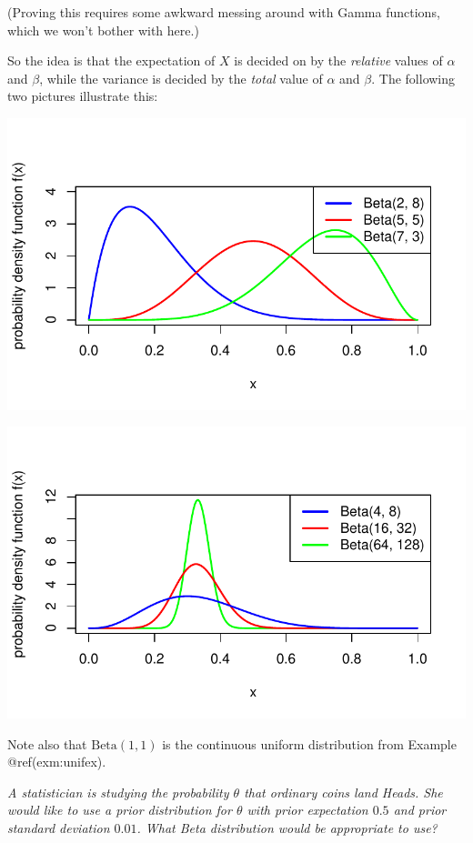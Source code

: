 \documentclass[
  letterpaper,
  DIV=11,
  numbers=noendperiod]{scrreprt}
\theoremstyle{remark}
\begin{document}
(Proving this requires some awkward messing around with Gamma functions,
which we won't bother with here.)

So the idea is that the expectation of \(X\) is decided on by the
\emph{relative} values of \(\alpha\) and \(\beta\), while the variance
is decided by the \emph{total} value of \(\alpha\) and \(\beta\). The
following two pictures illustrate this:

\includegraphics{sections/L20-bayes-models_files/figure-pdf/beta-pic-1-1.pdf}

\includegraphics{sections/L20-bayes-models_files/figure-pdf/beta-pic-2-1.pdf}

Note also that \(\text{Beta}(1,1)\) is the continuous uniform
distribution from Example @ref(exm:unifex).

\emph{A statistician is studying the probability \(\theta\) that
ordinary coins land Heads. She would like to use a prior distribution
for \(\theta\) with prior expectation \(0.5\) and prior standard
deviation \(0.01\). What Beta distribution would be appropriate to use?}
\end{document}
